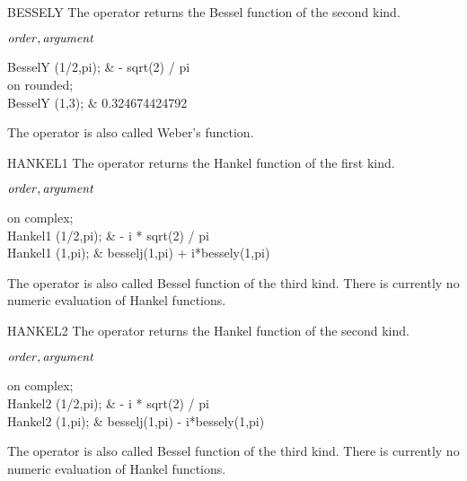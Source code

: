 \begin{Operator}{BESSELY}
The  operator returns the Bessel function of the second kind.
\begin{Syntax}
\(\meta{order},\meta{argument}\)
\end{Syntax}

\begin{Examples}
BesselY (1/2,pi);               &     - sqrt(2) / pi \\
on rounded; \\
BesselY (1,3);                  &      0.324674424792
\end{Examples}

\begin{Comments}
The operator  is also called Weber's function.
\end{Comments}
\end{Operator}

\begin{Operator}{HANKEL1}
The  operator returns the Hankel function of the first kind.

\begin{Syntax}
\(\meta{order},\meta{argument}\)
\end{Syntax}

\begin{Examples}
on complex; \\
Hankel1 (1/2,pi);               &     - i * sqrt(2) / pi \\
Hankel1 (1,pi);                 &   besselj(1,pi) + i*bessely(1,pi)

\end{Examples}

\begin{Comments}
The operator  is also called Bessel function of the third kind.
There is currently no numeric evaluation of Hankel functions.
\end{Comments}
\end{Operator}

\begin{Operator}{HANKEL2}
The  operator returns the Hankel function of the second kind.

\begin{Syntax}
\(\meta{order},\meta{argument}\)
\end{Syntax}

\begin{Examples}
on complex; \\
Hankel2 (1/2,pi);               &     - i * sqrt(2) / pi \\
Hankel2 (1,pi);                 &   besselj(1,pi) - i*bessely(1,pi)
\end{Examples}

\begin{Comments}
The operator  is also called Bessel function of the third kind.
There is currently no numeric evaluation of Hankel functions.
\end{Comments}
\end{Operator}

